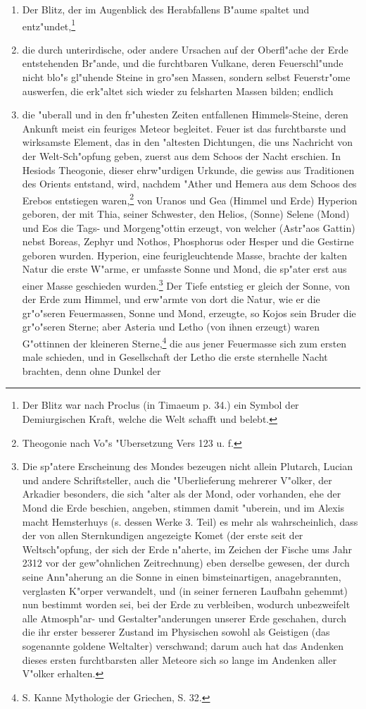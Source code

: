 \documentclass[a4paper, 11pt, oneside, polutonikogreek, german]{article}
\begin{document}
\begin{enumerate}
    \item Der Blitz, der im Augenblick des Herabfallens B"aume spaltet und entz"undet,\footnote{Der Blitz war nach Proclus (in Timaeum p. 34.) ein Symbol der Demiurgischen Kraft, welche die Welt schafft und belebt.}
    \item die durch unterirdische, oder andere Ursachen auf der Oberfl"ache der Erde entstehenden Br"ande, und die furchtbaren Vulkane, deren Feuerschl"unde nicht blo"s gl"uhende Steine in gro"sen Massen, sondern selbst Feuerstr"ome auswerfen, die erk"altet sich wieder zu felsharten Massen bilden; endlich
    \item die "uberall und in den fr"uhesten Zeiten entfallenen Himmels-Steine, deren Ankunft meist ein feuriges Meteor begleitet. Feuer ist das furchtbarste und wirksamste Element, das in den "altesten Dichtungen, die uns Nachricht von der Welt-Sch"opfung geben, zuerst aus dem Schoos der Nacht erschien. In Hesiods Theogonie, dieser ehrw"urdigen Urkunde, die gewiss aus Traditionen des Orients entstand, wird, nachdem "Ather und Hemera aus dem Schoos des Erebos entstiegen waren,\footnote{Theogonie nach Vo"s "Ubersetzung Vers 123 u. f.} von Uranos und Gea (Himmel und Erde) Hyperion geboren, der mit Thia, seiner Schwester, den Helios, (Sonne) Selene (Mond) und Eos die Tags- und Morgeng"ottin erzeugt, von welcher (Astr"aos Gattin) nebst Boreas, Zephyr und Nothos, Phosphorus oder Hesper und die Gestirne geboren wurden. Hyperion, eine feurigleuchtende Masse, brachte der kalten Natur die erste W"arme, er umfasste Sonne und Mond, die sp"ater erst aus einer Masse geschieden wurden.\footnote{Die sp"atere Erscheinung des Mondes bezeugen nicht allein Plutarch, Lucian und andere Schriftsteller, auch die "Uberlieferung mehrerer V"olker, der Arkadier besonders, die sich "alter als der Mond, oder vorhanden, ehe der Mond die Erde beschien, angeben, stimmen damit "uberein, und im Alexis macht Hemsterhuys (s. dessen Werke 3. Teil) es mehr als wahrscheinlich, dass der von allen Sternkundigen angezeigte Komet (der erste seit der Weltsch"opfung, der sich der Erde n"aherte, im Zeichen der Fische ums Jahr 2312 vor der gew"ohnlichen Zeitrechnung) eben derselbe gewesen, der durch seine Ann"aherung an die Sonne in einen bimsteinartigen, anagebrannten, verglasten K"orper verwandelt, und (in seiner ferneren Laufbahn gehemmt) nun bestimmt worden sei, bei der Erde zu verbleiben, wodurch unbezweifelt alle Atmosph"ar- und Gestalter"anderungen unserer Erde geschahen, durch die ihr erster besserer Zustand im Physischen sowohl als Geistigen (das sogenannte goldene Weltalter) verschwand; darum auch hat das Andenken dieses ersten furchtbarsten aller Meteore sich so lange im Andenken aller V"olker erhalten.} Der Tiefe entstieg er gleich der Sonne, von der Erde zum Himmel, und erw"armte von dort die Natur, wie er die gr"o"seren Feuermassen, Sonne und Mond, erzeugte, so Kojos sein Bruder die gr"o"seren Sterne; aber Asteria und Letho (von ihnen erzeugt) waren G"ottinnen der kleineren Sterne,\footnote{S. Kanne Mythologie der Griechen, S. 32.} die aus jener Feuermasse sich zum ersten male schieden, und in Gesellschaft der Letho die erste sternhelle Nacht brachten, denn ohne Dunkel der 
\end{enumerate}
\end{document}

